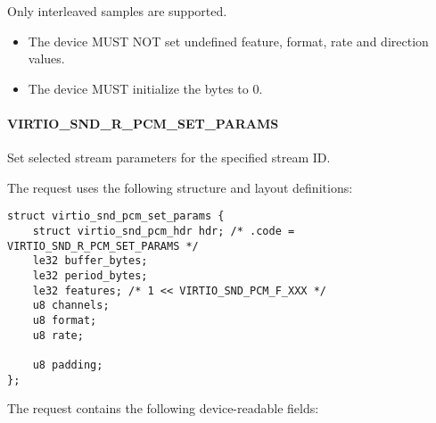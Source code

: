 Only interleaved samples are supported.


\begin{itemize}
\item The device MUST NOT set undefined feature, format, rate and direction
values.
\item The device MUST initialize the  bytes to 0.
\end{itemize}

\paragraph{VIRTIO_SND_R_PCM_SET_PARAMS}\label{sec:Device Types / Sound Device / Device Operation / PCM Stream Parameters}

Set selected stream parameters for the specified stream ID.

The request uses the following structure and layout definitions:

\begin{lstlisting}
struct virtio_snd_pcm_set_params {
    struct virtio_snd_pcm_hdr hdr; /* .code = VIRTIO_SND_R_PCM_SET_PARAMS */
    le32 buffer_bytes;
    le32 period_bytes;
    le32 features; /* 1 << VIRTIO_SND_PCM_F_XXX */
    u8 channels;
    u8 format;
    u8 rate;

    u8 padding;
};
\end{lstlisting}

The request contains the following device-readable fields:


